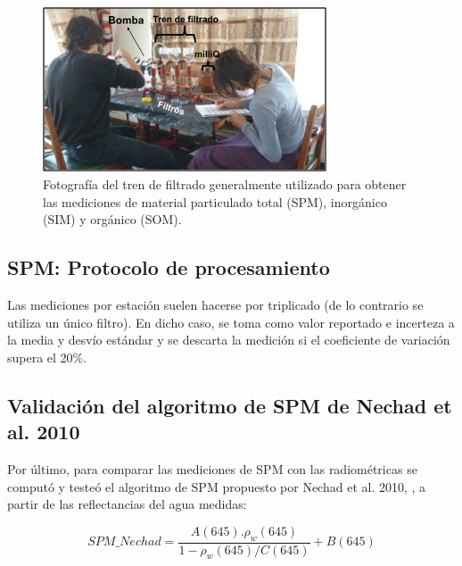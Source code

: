         \begin{figure}
            \centering
            \includegraphics[width=0.75\textwidth]{dat/figures/SPM.png}
            \caption[Fotografía del tren de filtrado utilizado para obtener las mediciones de material particulado total, inorgánico y orgánico.]{Fotografía del tren de filtrado generalmente utilizado para obtener las mediciones de material particulado total (SPM), inorgánico (SIM) y orgánico (SOM).}
            \label{dat:SPM}
        \end{figure}
            
    \subsection{SPM: Protocolo de procesamiento}
    \label{dat:s:spmProc}
    
        Las mediciones por estación suelen hacerse por triplicado (de lo contrario se utiliza un único filtro). En dicho caso, se toma como valor reportado e incerteza a la media y desvío estándar y se descarta la medición si el coeficiente de variación supera el 20\%. 

    \subsection{Validación del algoritmo de SPM de Nechad et al. 2010}
    \label{dat:s:spmNech10}

        Por último, para comparar las mediciones de SPM con las radiométricas se computó y testeó el algoritmo de SPM propuesto por Nechad et al. 2010, \cite{nechad2010}, a partir de las reflectancias del agua medidas:

        \begin{equation}
            SPM\_Nechad = \frac{A(645).\rho_{w}(645)}{1-\rho_{w}(645)/C(645)} + B(645)
            \label{dat:eq:nechad2010}
        \end{equation}

